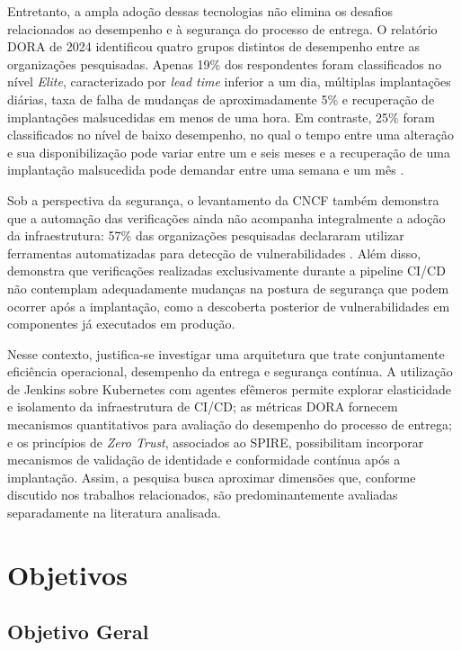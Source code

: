 Entretanto, a ampla adoção dessas tecnologias não elimina os desafios relacionados ao
desempenho e à segurança do processo de entrega. O relatório DORA de 2024 identificou
quatro grupos distintos de desempenho entre as organizações pesquisadas. Apenas 19\%
dos respondentes foram classificados no nível \textit{Elite}, caracterizado por
\textit{lead time} inferior a um dia, múltiplas implantações diárias, taxa de falha de
mudanças de aproximadamente 5\% e recuperação de implantações malsucedidas em menos de
uma hora. Em contraste, 25\% foram classificados no nível de baixo desempenho, no qual
o tempo entre uma alteração e sua disponibilização pode variar entre um e seis meses e
a recuperação de uma implantação malsucedida pode demandar entre uma semana e um mês
\cite{dora2024report}.

Sob a perspectiva da segurança, o levantamento da CNCF também demonstra que a
automação das verificações ainda não acompanha integralmente a adoção da infraestrutura:
57\% das organizações pesquisadas declararam utilizar ferramentas automatizadas para
detecção de vulnerabilidades \cite{cncf2024}. Além disso, 
demonstra que verificações realizadas exclusivamente durante a pipeline CI/CD não
contemplam adequadamente mudanças na postura de segurança que podem ocorrer após a
implantação, como a descoberta posterior de vulnerabilidades em componentes já
executados em produção.

Nesse contexto, justifica-se investigar uma arquitetura que trate conjuntamente
eficiência operacional, desempenho da entrega e segurança contínua. A utilização de
Jenkins sobre Kubernetes com agentes efêmeros permite explorar elasticidade e isolamento
da infraestrutura de CI/CD; as métricas DORA fornecem mecanismos quantitativos para
avaliação do desempenho do processo de entrega; e os princípios de \textit{Zero Trust},
associados ao SPIRE, possibilitam incorporar mecanismos de validação de identidade e
conformidade contínua após a implantação. Assim, a pesquisa busca aproximar dimensões
que, conforme discutido nos trabalhos relacionados, são predominantemente avaliadas
separadamente na literatura analisada.

\section{Objetivos}
\label{sec:objetivos}

\subsection{Objetivo Geral}
\label{sec:objetivo-geral}

